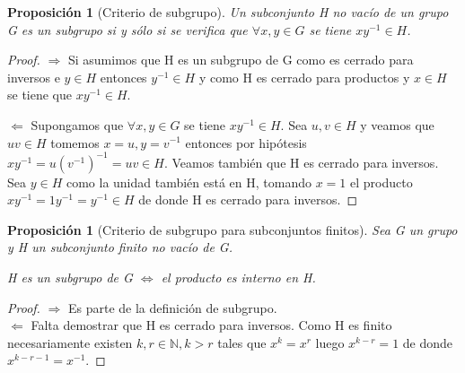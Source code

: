 \documentclass{article}
\theoremstyle{theorem-style}  %
\newtheorem{proposition}[theorem]{Proposición}
\theoremstyle{definition-style}
\theoremstyle{example-style}
\begin{document}
\begin{proposition}[Criterio de subgrupo]\label{proposition:criterio-subgrupo}
Un subconjunto H no vacío de un grupo G es un subgrupo si y sólo si se verifica que
$\forall x,y \in G$ se tiene $xy^{-1} \in H$.
\end{proposition}

\begin{proof}
$\Rightarrow$ Si asumimos que H es un subgrupo de G como es cerrado para inversos e $y \in H$ entonces $y^{-1} \in H$ y como H es cerrado para productos y $x \in H$ se tiene que $xy^{-1} \in H$.

$\Leftarrow$ Supongamos que $\forall x,y \in G$ se tiene $xy^{-1} \in H$. Sea $u,v \in H$ y veamos que $uv \in H$ tomemos $x = u,y = v^{-1}$ entonces por hipótesis $xy^{-1} = u(v^{-1})^{-1} = uv \in H$. Veamos también que H es cerrado para inversos. Sea $y \in H$ como la unidad también está en H, tomando $x = 1$ el producto $xy^{-1} = 1y^{-1} = y^{-1} \in H$ de donde H es cerrado para inversos.
\end{proof}

\begin{proposition}[Criterio de subgrupo para subconjuntos finitos]
Sea G un grupo y H un subconjunto finito no vacío de G. 

H es un subgrupo de G $\iff$ el producto es interno en H.
\end{proposition}

\begin{proof}
$\Rightarrow$ Es parte de la definición de subgrupo. \\
$\Leftarrow$ Falta demostrar que H es cerrado para inversos. Como H es finito necesariamente existen $k,r \in \mathbb{N}, k>r$ tales que $x^k = x^r$ luego $x^{k-r} = 1$ de donde $x^{k-r-1} = x^{-1}$. 
\end{proof}
\end{document}
